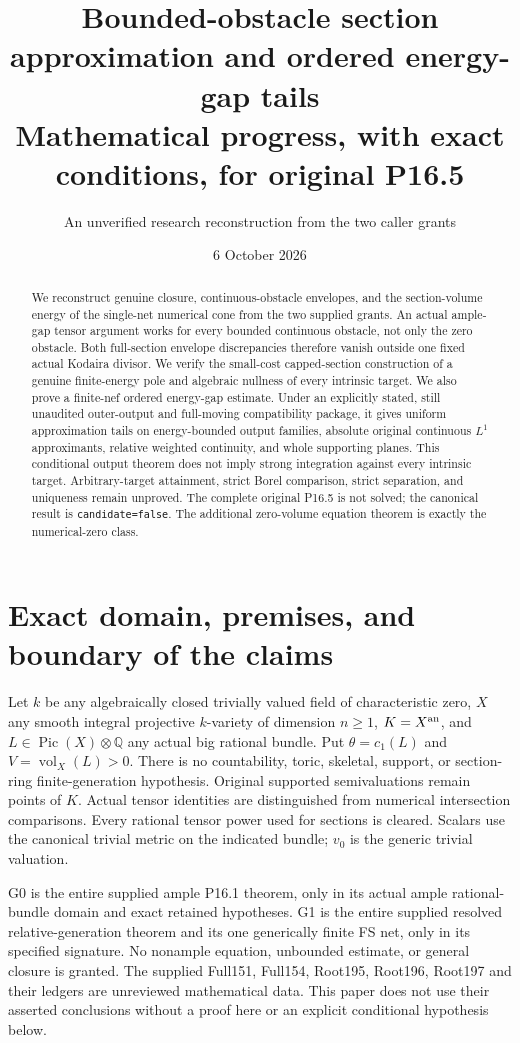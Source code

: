 \documentclass[10pt]{article}
\title{Bounded-obstacle section approximation and ordered energy-gap tails\\
\large Mathematical progress, with exact conditions, for original P16.5}
\author{An unverified research reconstruction from the two caller grants}
\date{6 October 2026}
\newcommand{\vol}{\operatorname{vol}}
\begin{document}
\maketitle
\begin{abstract}
We reconstruct genuine closure, continuous-obstacle envelopes, and the
section-volume energy of the single-net numerical cone from the two supplied
grants. An actual ample-gap tensor argument works for every bounded continuous
obstacle, not only the zero obstacle. Both full-section envelope discrepancies
therefore vanish outside one fixed actual Kodaira divisor. We verify the
small-cost capped-section construction of a genuine finite-energy pole and
algebraic nullness of every intrinsic target. We also prove a finite-nef
ordered energy-gap estimate. Under an explicitly stated, still unaudited
outer-output and full-moving compatibility package, it gives uniform
approximation tails on energy-bounded output families, absolute original
continuous $L^1$ approximants, relative weighted continuity, and whole
supporting planes. This conditional output theorem does not imply strong
integration against every intrinsic target. Arbitrary-target attainment,
strict Borel comparison, strict separation, and uniqueness remain unproved.
The complete original P16.5 is not solved; the canonical result is
\texttt{candidate=false}. The additional zero-volume equation theorem is
exactly the numerical-zero class.
\end{abstract}

\section{Exact domain, premises, and boundary of the claims}
Let $k$ be any algebraically closed trivially valued field of characteristic
zero, $X$ any smooth integral projective $k$-variety of dimension $n\geq1$,
$K=X^{\rm an}$, and $L\in\operatorname{Pic}(X)\otimes\mathbb Q$ any actual
big rational bundle. Put $\theta=c_1(L)$ and $V=\vol_X(L)>0$.
There is no countability, toric, skeletal, support, or section-ring
finite-generation hypothesis. Original supported semivaluations remain
points of $K$. Actual tensor identities are distinguished from numerical
intersection comparisons. Every rational tensor power used for sections
is cleared. Scalars use the canonical trivial metric on the indicated
bundle; $v_0$ is the generic trivial valuation.

G0 is the entire supplied ample P16.1 theorem, only in its actual ample
rational-bundle domain and exact retained hypotheses. G1 is the entire
supplied resolved relative-generation theorem and its one generically
finite FS net, only in its specified signature. No nonample equation,
unbounded estimate, or general closure is granted. The supplied Full151,
Full154, Root195, Root196, Root197 and their ledgers are unreviewed
mathematical data. This paper does not use their asserted conclusions
without a proof here or an explicit conditional hypothesis below.
\end{document}
